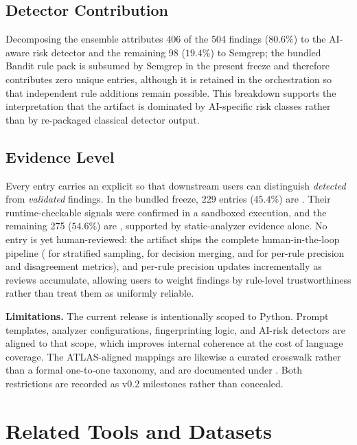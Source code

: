 \documentclass[sigconf,review,anonymous=false]{acmart}
\begin{document}
\subsection{Detector Contribution}

Decomposing the ensemble attributes 406 of the 504 findings
($80.6\%$) to the AI-aware risk detector and the remaining 98
($19.4\%$) to Semgrep; the bundled Bandit rule pack is subsumed by
Semgrep in the present freeze and therefore contributes zero unique
entries, although it is retained in the orchestration so that
independent rule additions remain possible. This breakdown supports
the interpretation that the artifact is dominated by AI-specific risk
classes rather than by re-packaged classical detector output.

\subsection{Evidence Level}

Every entry carries an explicit  so that
downstream users can distinguish \emph{detected} from
\emph{validated} findings. In the bundled freeze, 229 entries
($45.4\%$) are . Their runtime-checkable
signals were confirmed in a sandboxed execution, and the remaining
275 ($54.6\%$) are , supported by
static-analyzer evidence alone. No entry is yet human-reviewed: the
artifact ships the complete human-in-the-loop pipeline
( for stratified sampling,
 for decision merging, and
 for
per-rule precision and disagreement metrics), and per-rule precision
updates incrementally as reviews accumulate, allowing users to
weight findings by rule-level trustworthiness rather than treat them
as uniformly reliable.

\textbf{Limitations.} The current release is intentionally scoped to
Python. Prompt templates, analyzer configurations, fingerprinting
logic, and AI-risk detectors are aligned to that scope, which improves
internal coherence at the cost of language coverage. The
ATLAS-aligned mappings are likewise a curated crosswalk rather than a
formal one-to-one taxonomy, and are documented under
. Both restrictions are recorded as v0.2
milestones rather than concealed.

\section{Related Tools and Datasets}
\end{document}
